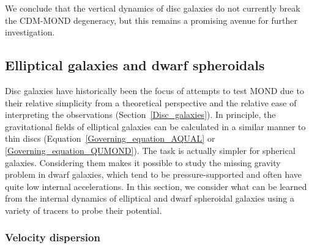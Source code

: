 \documentclass[fleqn,usenatbib,useAMS,onecolumn]{mnras} %
\begin{document}
We conclude that the vertical dynamics of disc galaxies do not currently break the CDM-MOND degeneracy, but this remains a promising avenue for further investigation.



\subsection{Elliptical galaxies and dwarf spheroidals}
\label{Elliptical_galaxies}

Disc galaxies have historically been the focus of attempts to test MOND due to their relative simplicity from a theoretical perspective and the relative ease of interpreting the observations (Section~\ref{Disc_galaxies}). In principle, the gravitational fields of elliptical galaxies can be calculated in a similar manner to thin discs (Equation~\ref{Governing_equation_AQUAL} or \ref{Governing_equation_QUMOND}). The task is actually simpler for spherical galaxies. Considering them makes it possible to study the missing gravity problem in dwarf galaxies, which tend to be pressure-supported and often have quite low internal accelerations. In this section, we consider what can be learned from the internal dynamics of elliptical and dwarf spheroidal galaxies using a variety of tracers to probe their potential.


\subsubsection{Velocity dispersion}
\label{Galaxy_internal_sigma}
\end{document}
